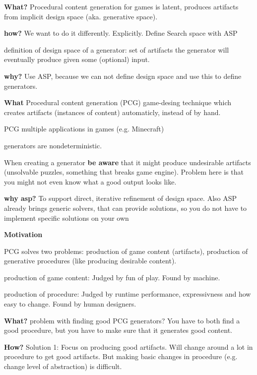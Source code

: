 \documentclass[runningheads]{llncs}
\begin{document}
\begin{list}
    \item \textbf{What?} Procedural content generation for games is latent, produces artifacts from implicit design space (aka. generative space). 
    \item \textbf{how?} We want to do it differently. Explicitly. Define Search space with ASP 
    \item definition of design space of a generator: set of artifacts the generator will eventually produce given some (optional) input.
    \item \textbf{why?} Use ASP, because we can not define design space and use this to define generators.
    \item \textbf{What} Procedural content generation (PCG) game-desing technique which creates artifacts (instances of content) automaticly, instead of by hand. 
    \item PCG multiple applications in games (e.g. Minecraft)
    \item generators are nondeterministic.
    \item When creating a generator \textbf{be aware} that it might produce undesirable artifacts (unsolvable puzzles, something that breaks game engine). Problem here is that you might not even know what a good output looks like.
    \item \textbf{why asp?} To support direct, iterative refinement of design space. Also ASP already brings generic solvers, that can provide solutions, so you do not have to implement specific solutions on your own
    \item \textbf{Motivation}
    \item PCG solves two problems: production of game content (artifacts), production of generative procedures (like producing desirable content). 
    \item production of game content: Judged by fun of play. Found by machine. 
    \item production of procedure: Judged by runtime performance, expressivness and how easy to change. Found by human designers. 
    \item \textbf{What?} problem with finding good PCG generators? You have to both find a good procedure, but you have to make sure that it generates good content. 
    \item \textbf{How?} Solution 1: Focus on producing good artifacts. Will change around a lot in procedure to get good artifacts. But making basic changes in procedure (e.g. change level of abstraction) is difficult. 

\end{list}
\end{document}
